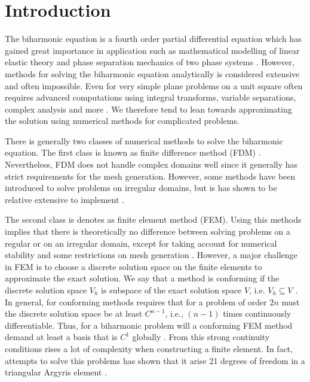 \section{Introduction}\label{sec:introduction}


The biharmonic equation is a fourth order partial differential equation which has gained great importance in
application such as mathematical modelling of linear elastic theory \cite{selvadurai13} and phase separation mechanics
of two phase systems \cite{cahnhilliard1957, kim16}. However, methods for solving the biharmonic equation analytically
is considered extensive and often impossible. Even for very simple plane problems on a unit square often requires advanced computations using integral transforms, variable separations, complex analysis and more \cite{selvadurai13}. We therefore tend
to lean towards approximating the solution using numerical methods for complicated problems.

There is generally two classes of numerical methods to solve the biharmonic equation. The first class is known as finite difference method (FDM) \cite{geer06,ehrlich75, hackbusch17}. Nevertheless, FDM does not handle complex domains well since it generally has strict requirements for the mesh generation. However, some methods have been introduced to solve problems on irregular domains, but is has shown to be relative extensive to implement \cite{hackbusch17, chen08, belyaev18}.

The second class is denotes as finite element method (FEM). Using this methods implies that there is theoretically no difference between solving problems on a regular or on an irregular domain, except for taking account for numerical stability and some
restrictions on mesh generation \cite{chen08}. However, a major challenge in FEM is to choose a discrete solution space on the finite elements to approximate the exact solution. We say that a method is conforming if the discrete solution space
$V_{h}$ is subspace of the exact solution space $V$, i.e. $V_{h} \subseteq  V$ \cite{shi02, brenner07math}. In general, for conforming methods requires that for a problem of order $2n$ must the discrete solution space be at least $C^{n-1}$, i.e.,
$(n-1)$ times continuously differentiable. Thus, for a biharmonic problem
will a conforming FEM method demand at least a basis that is $C^1$ globally \cite{shi02}. From this strong continuity conditions rises a lot of complexity when constructing a finite element. In fact, attempts to solve this problems has shown that it
arise 21 degrees of freedom in a triangular Argyris element \cite{nair21}.

